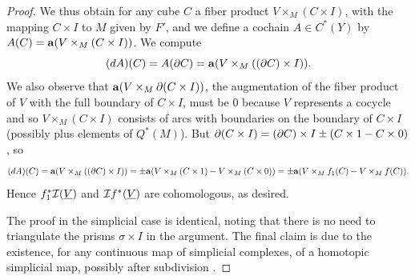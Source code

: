 \begin{proof}
	We thus obtain for any cube $C$ a fiber product $V \times_M (C \times I)$, with the mapping $C \times I$ to $M$ given by $F'$, and we define a cochain $A \in C^*(Y)$ by $A(C) = \mathbf{a}(V \times_M (C \times I))$.
	We compute $$(dA)(C) = A(\partial C) = \mathbf{a}(V \times_M ((\partial C) \times I)).$$
	We also observe that $\mathbf{a}(V \times_M \partial (C \times I))$, the augmentation of the fiber product of $V$ with the full boundary of $C \times I$, must be $0$ because $V$ represents a cocycle and so $V \times_M (C\times I)$ consists of arcs with boundaries on the boundary of $C\times I$ (possibly plus elements of $Q^*(M)$).
	But $\partial (C \times I) = (\partial C) \times I \pm (C \times 1 - C \times 0)$,
	so $$(dA)(C) = \mathbf{a}(V \times_M ((\partial C) \times I)) = \pm \mathbf{a}(V \times_M (C \times 1) - V \times_M  (C \times 0))=\pm \mathbf{a}(V\times_M f_1(C) - V \times_M f(C)).$$
	Hence $f_1^* \mathcal{I}(\underline{V})$ and $\mathcal{I} f^*(\underline{V})$ are cohomologous, as desired.

	The proof in the simplicial case is identical, noting that there is no need to triangulate the prisms $\sigma \times I$ in the argument.
	The final claim is due to the existence, for any continuous map of simplicial complexes, of a homotopic simplicial map, possibly after subdivision \cite[Section 16]{Mun84}.
\end{proof}
